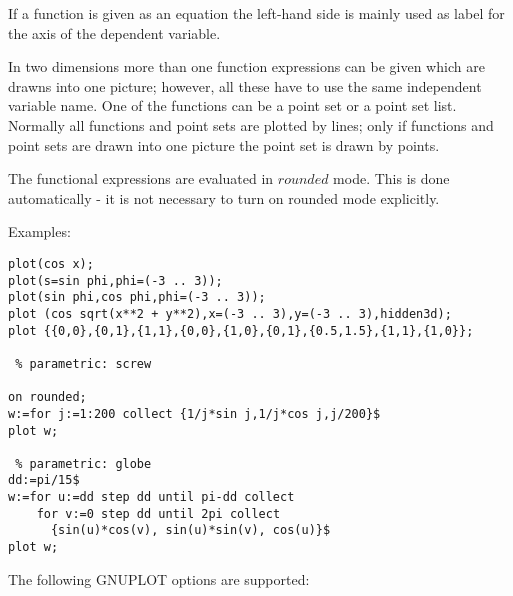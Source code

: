 If a function is given as an equation the left-hand side
  is mainly used as label for the axis of the dependent variable.

In two dimensions more than one function expressions can be given
which are drawns into one picture; however,
all these have to use the same independent variable name.
One of the functions can be a point set or a point set list.
Normally all functions and point sets are plotted by
lines; only if functions and point sets are drawn into
one picture the point set is drawn by points.

The functional expressions are evaluated in $rounded$ mode.
This is done automatically - it is not necessary to turn
on rounded mode explicitly. 

Examples:
\begin{verbatim}
plot(cos x);
plot(s=sin phi,phi=(-3 .. 3));
plot(sin phi,cos phi,phi=(-3 .. 3));
plot (cos sqrt(x**2 + y**2),x=(-3 .. 3),y=(-3 .. 3),hidden3d);
plot {{0,0},{0,1},{1,1},{0,0},{1,0},{0,1},{0.5,1.5},{1,1},{1,0}};

 % parametric: screw

on rounded;
w:=for j:=1:200 collect {1/j*sin j,1/j*cos j,j/200}$
plot w;

 % parametric: globe
dd:=pi/15$
w:=for u:=dd step dd until pi-dd collect
    for v:=0 step dd until 2pi collect
      {sin(u)*cos(v), sin(u)*sin(v), cos(u)}$
plot w;
\end{verbatim}
 
The following GNUPLOT options are supported:

